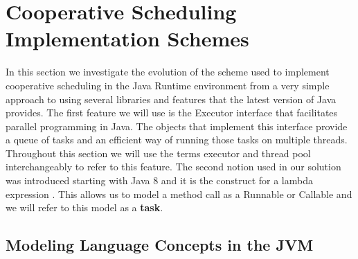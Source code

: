 \section{Cooperative Scheduling Implementation Schemes}
\label{scheme}

In this section we investigate the evolution of the scheme used to implement cooperative scheduling in the Java Runtime environment from a very simple approach to using several libraries and features that the latest version of Java provides. The first feature we will use is the Executor interface \cite{execserv} that facilitates parallel programming in Java. The objects that implement this interface provide a queue of tasks and an efficient way of running those tasks on multiple threads. Throughout this section we will use the terms executor and thread pool interchangeably to refer to this feature. The second notion used in our solution was introduced starting with Java 8 and it is the construct for a lambda expression \cite{lambdas}. This allows us to model a method call as a Runnable or Callable and we will refer to this model as a \textbf{task}. 



\subsection{Modeling Language Concepts in the JVM}

